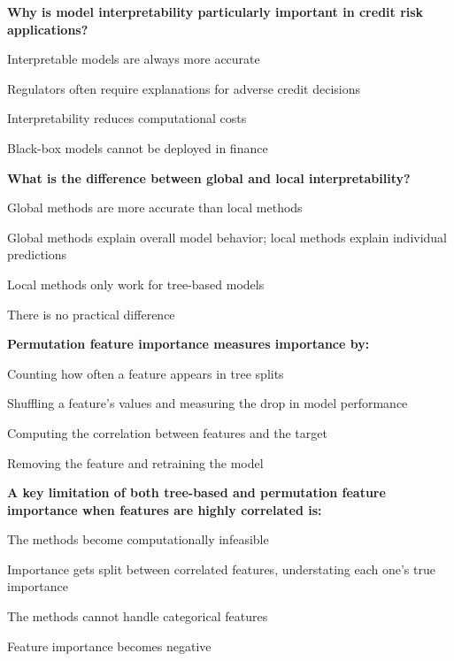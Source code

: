\documentclass[11pt]{article}
\begin{document}
\begin{questions}[resume]

\item \textbf{Why is model interpretability particularly important in credit risk applications?}
\begin{options}
  \item Interpretable models are always more accurate
  \item Regulators often require explanations for adverse credit decisions
  \item Interpretability reduces computational costs
  \item Black-box models cannot be deployed in finance
\end{options}

\item \textbf{What is the difference between global and local interpretability?}
\begin{options}
  \item Global methods are more accurate than local methods
  \item Global methods explain overall model behavior; local methods explain individual predictions
  \item Local methods only work for tree-based models
  \item There is no practical difference
\end{options}

\item \textbf{Permutation feature importance measures importance by:}
\begin{options}
  \item Counting how often a feature appears in tree splits
  \item Shuffling a feature's values and measuring the drop in model performance
  \item Computing the correlation between features and the target
  \item Removing the feature and retraining the model
\end{options}

\item \textbf{A key limitation of both tree-based and permutation feature importance when features are highly correlated is:}
\begin{options}
  \item The methods become computationally infeasible
  \item Importance gets split between correlated features, understating each one's true importance
  \item The methods cannot handle categorical features
  \item Feature importance becomes negative
\end{options}


\end{questions}
\end{document}
